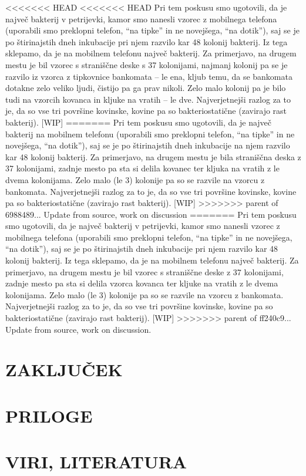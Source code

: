 \documentclass[12pt, a4paper, oneside]{report}
\begin{document}
<<<<<<< HEAD
<<<<<<< HEAD
Pri tem poskusu smo ugotovili, da je največ bakterij v petrijevki, kamor smo nanesli vzorec z mobilnega telefona (uporabili smo preklopni telefon, ``na tipke'' in ne novejšega, ``na dotik''), saj se je po štirinajstih dneh inkubacije pri njem razvilo kar 48 kolonij bakterij. Iz tega sklepamo, da je na mobilnem telefonu največ bakterij. Za primerjavo, na drugem mestu je bil vzorec s straniščne deske s 37 kolonijami, najmanj kolonij pa se je razvilo iz vzorca z tipkovnice bankomata -- le ena, kljub temu, da se bankomata dotakne zelo veliko ljudi, čistijo pa ga prav nikoli. Zelo malo kolonij pa je bilo tudi na vzorcih kovanca in kljuke na vratih – le dve. Najverjetnejši razlog za to je, da so vse tri površine kovinske, kovine pa so bakteriostatične (zavirajo rast bakterij). [WIP]
=======
Pri tem poskusu smo ugotovili, da je največ bakterij na mobilnem telefonu (uporabili smo preklopni telefon, ``na tipke'' in ne novejšega, ``na dotik''), saj se je po štirinajstih dneh inkubacije na njem razvilo kar 48 kolonij bakterij. Za primerjavo, na drugem mestu je bila straniščna deska z 37 kolonijami, zadnje mesto pa sta si delila kovanec ter kljuka na vratih z le dvema kolonijama. Zelo malo (le 3) kolonije pa so se razvile na vzorcu z bankomata. Najverjetnejši razlog za to je, da so vse tri površine kovinske, kovine pa so bakteriostatične (zavirajo rast bakterij). [WIP]
>>>>>>> parent of 6988489... Update from source, work on discussion
=======
Pri tem poskusu smo ugotovili, da je največ bakterij v petrijevki, kamor smo nanesli vzorec z mobilnega telefona (uporabili smo preklopni telefon, ``na tipke'' in ne novejšega, ``na dotik''), saj se je po štirinajstih dneh inkubacije pri njem razvilo kar 48 kolonij bakterij. Iz tega sklepamo, da je na mobilnem telefonu največ bakterij.  Za primerjavo, na drugem mestu je bil vzorec s straniščne deske z 37 kolonijami, zadnje mesto pa sta si delila vzorca kovanca ter kljuke na vratih z le dvema kolonijama. Zelo malo (le 3) kolonije pa so se razvile na vzorcu z bankomata. Najverjetnejši razlog za to je, da so vse tri površine kovinske, kovine pa so bakteriostatične (zavirajo rast bakterij). [WIP]
>>>>>>> parent of ff240c9... Update from source, work on discussion.

\chapter{ZAKLJUČEK}

\chapter{PRILOGE}

\chapter{VIRI, LITERATURA}
%
\printbibliography
\end{document}
